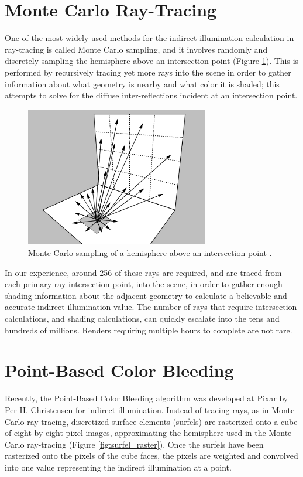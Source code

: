 \section{Monte Carlo Ray-Tracing}
\label{sec:monte_carlo}
One of the most widely used methods for the indirect illumination calculation in ray-tracing is called Monte Carlo sampling, and it involves randomly and discretely sampling the hemisphere above an intersection point (Figure \ref{fig:monte_carlo}). This is performed by recursively tracing yet more rays into the scene in order to gather information about what geometry is nearby and what color it is shaded; this attempts to solve for the diffuse inter-reflections incident at an intersection point. 

\begin{figure}[h]
   \centering
   \includegraphics[width=80mm]{../img/shirley_monte_carlo.png}
   \captionfonts
   \caption[Monte Carlo hemisphere]{Monte Carlo sampling of a hemisphere above an intersection point \cite{bib:shirley1991}.}
   \label{fig:monte_carlo}
\end{figure}

In our experience, around 256 of these rays are required, and are traced from each primary ray intersection point, into the scene, in order to gather enough shading information about the adjacent geometry to calculate a believable and accurate indirect illumination value. The number of rays that require intersection calculations, and shading calculations, can quickly escalate into the tens and hundreds of millions. Renders requiring multiple hours to complete are not rare.

\section{Point-Based Color Bleeding}
Recently, the Point-Based Color Bleeding algorithm was developed at Pixar by Per H. Christensen \cite{bib:christensen2008} for indirect illumination. Instead of tracing rays, as in Monte Carlo ray-tracing, discretized surface elements (surfels) are rasterized onto a cube of eight-by-eight-pixel images, approximating the hemisphere used in the Monte Carlo ray-tracing (Figure \ref{fig:surfel_raster}). Once the surfels have been rasterized onto the pixels of the cube faces, the pixels are weighted and convolved into one value representing the indirect illumination at a point.

